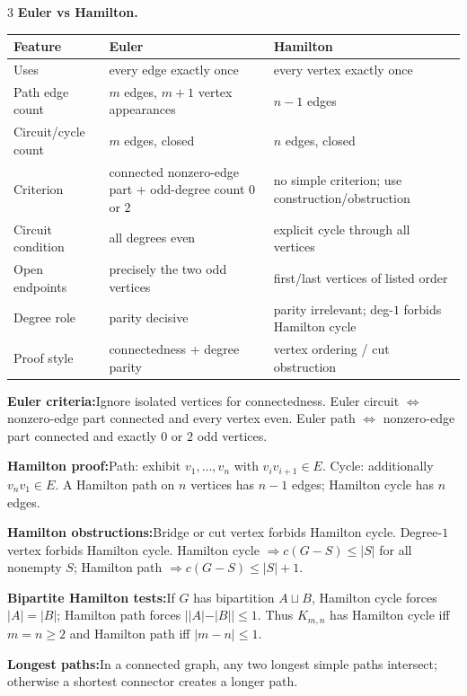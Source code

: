 \documentclass[10pt]{article}
\newenvironment{cheatitems}{\par\vspace{-1pt}}{\par\vspace{-1pt}}
\newcommand{\cheatrow}[2]{\par\noindent\textbf{#1:}\enspace #2\par}
\begin{document}
\begin{multicols}{3}
\vspace{1pt}\noindent\textbf{Euler vs Hamilton.}\par
\begin{tabular}{@{}p{}p{}p{}@{}}
\toprule
Feature & Euler & Hamilton\\
\midrule
Uses & every edge exactly once & every vertex exactly once\\
Path edge count & $m$ edges, $m+1$ vertex appearances & $n-1$ edges\\
Circuit/cycle count & $m$ edges, closed & $n$ edges, closed\\
Criterion & connected nonzero-edge part + odd-degree count $0$ or $2$ & no simple criterion; use construction/obstruction\\
Circuit condition & all degrees even & explicit cycle through all vertices\\
Open endpoints & precisely the two odd vertices & first/last vertices of listed order\\
Degree role & parity decisive & parity irrelevant; deg-$1$ forbids Hamilton cycle\\
Proof style & connectedness + degree parity & vertex ordering / cut obstruction\\
\bottomrule
\end{tabular}

\begin{cheatitems}
\cheatrow{Euler criteria}{Ignore isolated vertices for connectedness. Euler circuit $\iff$ nonzero-edge part connected and every vertex even. Euler path $\iff$ nonzero-edge part connected and exactly $0$ or $2$ odd vertices.}
\cheatrow{Hamilton proof}{Path: exhibit $v_1,\ldots,v_n$ with $v_iv_{i+1}\in E$. Cycle: additionally $v_nv_1\in E$. A Hamilton path on $n$ vertices has $n-1$ edges; Hamilton cycle has $n$ edges.}
\cheatrow{Hamilton obstructions}{Bridge or cut vertex forbids Hamilton cycle. Degree-$1$ vertex forbids Hamilton cycle. Hamilton cycle $\Rightarrow c(G-S)\le |S|$ for all nonempty $S$; Hamilton path $\Rightarrow c(G-S)\le |S|+1$.}
\cheatrow{Bipartite Hamilton tests}{If $G$ has bipartition $A\sqcup B$, Hamilton cycle forces $|A|=|B|$; Hamilton path forces $||A|-|B||\le1$. Thus $K_{m,n}$ has Hamilton cycle iff $m=n\ge2$ and Hamilton path iff $|m-n|\le1$.}
\cheatrow{Longest paths}{In a connected graph, any two longest simple paths intersect; otherwise a shortest connector creates a longer path.}
\end{cheatitems}


\end{multicols}
\end{document}
